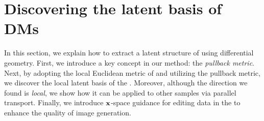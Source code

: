 \section{Discovering the latent basis of DMs}
\label{sec:sec3}
In this section, we explain how to extract a latent structure of \exspace{} using differential geometry. 
First, we introduce a key concept in our method: the {\it pullback metric}. 
Next, by adopting the local Euclidean metric of \ehspace{} and utilizing the pullback metric, we discover the local latent basis of the \exspace{}. 
Moreover, although the direction we found is {\it local}, we show how it can be applied to other samples via parallel transport. 
Finally, we introduce $\mathbf{x}$-space guidance for editing data in the \exspace{} {to enhance the quality of image generation.}



